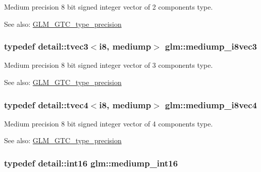Medium precision 8 bit signed integer vector of 2 components type. \begin{Desc}
\item[See also:]\hyperlink{group__gtc__type__precision}{GLM\_\-GTC\_\-type\_\-precision} \end{Desc}
\hypertarget{group__gtc__type__precision_g91b40a693c1db26a7cc544339b326df3}{
\subsubsection[mediump\_\-i8vec3]{\setlength{\rightskip}{0pt plus 5cm}typedef detail::tvec3$<$i8, mediump$>$ {\bf glm::mediump\_\-i8vec3}}}
\label{group__gtc__type__precision_g91b40a693c1db26a7cc544339b326df3}


Medium precision 8 bit signed integer vector of 3 components type. \begin{Desc}
\item[See also:]\hyperlink{group__gtc__type__precision}{GLM\_\-GTC\_\-type\_\-precision} \end{Desc}
\hypertarget{group__gtc__type__precision_gd41bf4bfa504dc1191623ff77151d01f}{
\subsubsection[mediump\_\-i8vec4]{\setlength{\rightskip}{0pt plus 5cm}typedef detail::tvec4$<$i8, mediump$>$ {\bf glm::mediump\_\-i8vec4}}}
\label{group__gtc__type__precision_gd41bf4bfa504dc1191623ff77151d01f}


Medium precision 8 bit signed integer vector of 4 components type. \begin{Desc}
\item[See also:]\hyperlink{group__gtc__type__precision}{GLM\_\-GTC\_\-type\_\-precision} \end{Desc}
\hypertarget{group__gtc__type__precision_g4611997edb6c61606daa11990cf08798}{
\subsubsection[mediump\_\-int16]{\setlength{\rightskip}{0pt plus 5cm}typedef detail::int16 {\bf glm::mediump\_\-int16}}}
\label{group__gtc__type__precision_g4611997edb6c61606daa11990cf08798}


